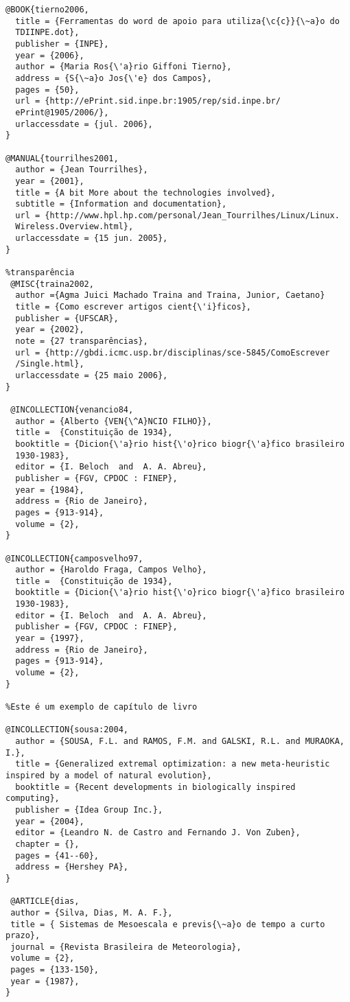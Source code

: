 \begin{verbatim}
@BOOK{tierno2006,   
  title = {Ferramentas do word de apoio para utiliza{\c{c}}{\~a}o do 
  TDIINPE.dot},
  publisher = {INPE},  
  year = {2006},  
  author = {Maria Ros{\'a}rio Giffoni Tierno}, 
  address = {S{\~a}o Jos{\'e} dos Campos},   
  pages = {50},  
  url = {http://ePrint.sid.inpe.br:1905/rep/sid.inpe.br/
  ePrint@1905/2006/}, 
  urlaccessdate = {jul. 2006},
}

@MANUAL{tourrilhes2001,
  author = {Jean Tourrilhes},
  year = {2001},
  title = {A bit More about the technologies involved},
  subtitle = {Information and documentation},
  url = {http://www.hpl.hp.com/personal/Jean_Tourrilhes/Linux/Linux.
  Wireless.Overview.html},
  urlaccessdate = {15 jun. 2005},
}

%transparência
 @MISC{traina2002,
  author ={Agma Juici Machado Traina and Traina, Junior, Caetano}
  title = {Como escrever artigos cient{\'i}ficos},
  publisher = {UFSCAR},
  year = {2002},
  note = {27 transparências},
  url = {http://gbdi.icmc.usp.br/disciplinas/sce-5845/ComoEscrever
  /Single.html},
  urlaccessdate = {25 maio 2006},
}

 @INCOLLECTION{venancio84,
  author = {Alberto {VEN{\^A}NCIO FILHO}},
  title =  {Constituição de 1934},
  booktitle = {Dicion{\'a}rio hist{\'o}rico biogr{\'a}fico brasileiro 
  1930-1983},
  editor = {I. Beloch  and  A. A. Abreu},
  publisher = {FGV, CPDOC : FINEP}, 
  year = {1984},
  address = {Rio de Janeiro}, 
  pages = {913-914},
  volume = {2},
}  

@INCOLLECTION{camposvelho97,
  author = {Haroldo Fraga, Campos Velho},
  title =  {Constituição de 1934},
  booktitle = {Dicion{\'a}rio hist{\'o}rico biogr{\'a}fico brasileiro 
  1930-1983},
  editor = {I. Beloch  and  A. A. Abreu},
  publisher = {FGV, CPDOC : FINEP}, 
  year = {1997},
  address = {Rio de Janeiro}, 
  pages = {913-914},
  volume = {2},
}  

%Este é um exemplo de capítulo de livro 

@INCOLLECTION{sousa:2004,
  author = {SOUSA, F.L. and RAMOS, F.M. and GALSKI, R.L. and MURAOKA, I.},
  title = {Generalized extremal optimization: a new meta-heuristic inspired by a model of natural evolution},
  booktitle = {Recent developments in biologically inspired computing},
  publisher = {Idea Group Inc.},
  year = {2004},
  editor = {Leandro N. de Castro and Fernando J. Von Zuben},
  chapter = {},
  pages = {41--60},
  address = {Hershey PA},
}

 @ARTICLE{dias,
 author = {Silva, Dias, M. A. F.},
 title = { Sistemas de Mesoescala e previs{\~a}o de tempo a curto prazo},
 journal = {Revista Brasileira de Meteorologia},
 volume = {2},
 pages = {133-150},
 year = {1987},
}


\end{verbatim}
